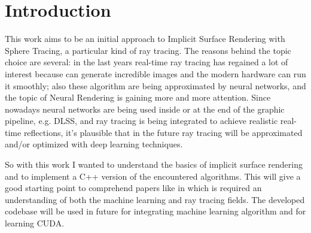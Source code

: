 
\section{Introduction}
This work aims to be an initial approach to Implicit Surface Rendering with Sphere Tracing, a particular kind of ray tracing.
The reasons behind the topic choice are several:
in the last years real-time ray tracing has regained a lot of interest because can generate incredible images and the modern hardware can run it smoothly;
also these algorithm are being approximated by neural networks, and the topic of Neural Rendering is gaining more and more attention.
Since nowadays neural networks are being used inside or at the end of the graphic pipeline, e.g. DLSS, and ray tracing is being integrated to achieve realistic real-time reflections, it's plausible that in the future ray tracing will be approximated and/or optimized with deep learning techniques.

So with this work I wanted to understand the basics of implicit surface rendering and to implement a C++ version of the encountered algorithms.
This will give a good starting point to comprehend papers like \cite{nglod} in which is required an understanding of both the machine learning and ray tracing fields.
The developed codebase will be used in future for integrating machine learning algorithm and for learning CUDA.


